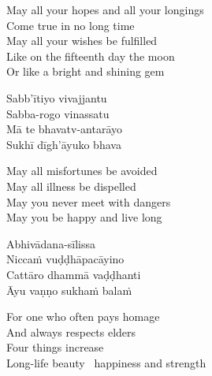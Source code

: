 \begin{english-verses}
  May all your hopes and all your longings\\
  Come true in no long time\\
  May all your wishes be fulfilled\\
  Like on the fifteenth day the moon\\
  Or like a bright and shining gem
\end{english-verses}


\begin{pali-hang-continued}
  Sabb'ītiyo vivajjantu\hyperlink{endnote1-appendix}{\hypertarget{endnote1-body}{}}\\
  Sabba-rogo vinassatu\\
  Mā te bhavatv-antarāyo\\
  Sukhī dīgh'āyuko bhava
\end{pali-hang-continued}

\begin{english-verses}
  May all misfortunes be avoided\\
  May all illness be dispelled\\
  May you never meet with dangers\\
  May you be happy and live long
\end{english-verses}

\suttaRef{[Khp A]}

\begin{pali-hang-continued}
  Abhivādana-sīlissa\\
  Niccaṁ vuḍḍhāpacāyino\\
  Cattāro dhammā vaḍḍhanti\\
  Āyu vaṇṇo sukhaṁ balaṁ\hyperlink{endnote1-appendix}{\hypertarget{endnote1-body}{}}
\end{pali-hang-continued}

\begin{english-verses}
  For one who often pays homage\\
  And always respects elders\\
  Four things increase\\
  Long-life beauty \breathmark\ happiness and strength
\end{english-verses}

